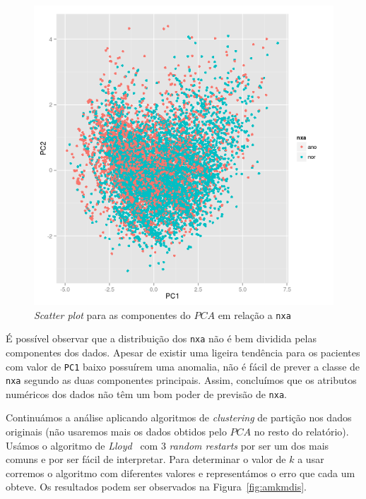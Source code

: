 \documentclass[10pt, conference, compsocconf]{IEEEtran}
\begin{document}
\begin{figure}[H]
  \centering
  \includegraphics[scale=0.4]{img/amv_pcast.png}
  \caption{\textit{Scatter plot} para as componentes do $PCA$ em relação a {\tt nxa}}
  \label{fig:ampcast}
\end{figure}

É possível observar que a distribuição dos {\tt nxa} não é bem
dividida pelas componentes dos dados. Apesar de existir uma ligeira
tendência para os pacientes com valor de {\tt PC1} baixo possuírem uma
anomalia, não é fácil de prever a classe de {\tt nxa} segundo as duas
componentes principais. Assim, concluímos que os atributos numéricos
dos dados não têm um bom poder de previsão de {\tt nxa}.

Continuámos a análise aplicando algoritmos de \textit{clustering} de
partição nos dados originais (não usaremos mais os dados obtidos pelo
$PCA$ no resto do relatório). Usámos o algoritmo de
\textit{Lloyd}~\cite{forgy1965cluster} com 3 \textit{random restarts}
por ser um dos mais comuns e por ser fácil de interpretar. Para
determinar o valor de $k$ a usar corremos o algoritmo com diferentes
valores e representámos o erro que cada um obteve. Os resultados podem
ser observados na Figura~\ref{fig:amkmdis}.
\end{document}
